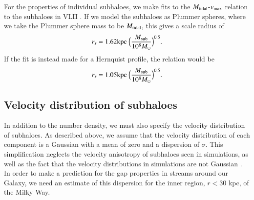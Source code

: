 \documentclass[useAMS,usenatbib]{mn2e}
\newcommand{\eq}[1]{\begin{align}#1\end{align}}
\begin{document}
For the properties of individual subhaloes, we make fits to the $M_{\rm tidal}$-$v_{\rm max}$ relation to the subhaloes in VLII \citep{Diemand2008}. If we model the subhaloes as Plummer spheres, where we take the Plummer sphere mass to be $M_{\rm tidal}$, this gives a scale radius of 
%
\eq{ r_s = 1.62 {\rm kpc}~\Big( \frac{M_{\rm sub}}{10^8 M_\odot} \Big)^{0.5} . \label{eq:plummer_r} }
%
If the fit is instead made for a Hernquist profile, the relation would be
%
\eq{ r_s = 1.05 {\rm kpc}~\Big( \frac{M_{\rm sub}}{10^8 M_\odot} \Big)^{0.5} . \label{eq:hernquist_r}}

\subsection{Velocity distribution of subhaloes}

In addition to the number density, we must also specify the velocity distribution of subhaloes. As described above, we assume that the velocity distribution of each component is a Gaussian with a mean of zero and a dispersion of $\sigma$. This simplification neglects the velocity anisotropy of subhaloes seen in simulations, as well as the fact that the velocity distributions in simulations are not Gaussian \citep[e.g.][]{diemand_et_al_2004}. In order to make a prediction for the gap properties in streams around our Galaxy, we need an estimate of this dispersion for the inner region, $r<30$ kpc, of the Milky Way. 
\end{document}
